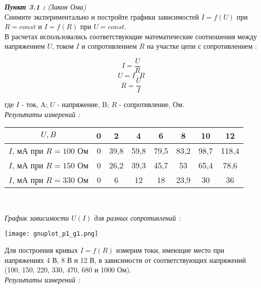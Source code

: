\documentclass[a4paper,11pt]{article}
\begin{document}
	\begin{flushleft}
		\textit{\textbf{Пункт 3.1 :} (Закон Ома)}
		\\
		\medskip
		\hangindent=1.5cm  \noindent
		Снимите экспериментально и постройте графики зависимостей ${I=f(U)}$ при  ${R=const}$ и ${I=f(R)}$ при ${U=const}$.\\
		В расчетах использовались соответствующие математические соотношения между напряжением ${U}$, током ${I}$ и сопротивлением ${R}$ на участке цепи с сопротивлением :
		\begin{center}
			\begin{equation}
				I = \frac{U}{R}
			\end{equation}
			\begin{equation}
				U = I\cdot R
			\end{equation}
			\begin{equation}	
				R = \frac{U}{I}
			\end{equation}
		\end{center}
		где ${I}$ - ток, A; ${U}$ - напряжение, B; ${R}$ -  сопротивление, Ом.
		\\
		\medskip
		\textit{Результаты измерений : }
		\\
		\medskip
		\begin{center}
			\begin{tabular}{|c|c|c|c|c|c|c|c|}
\hline ${U, B}$ & 0 & 2 & 4 & 6 & 8 & 10 & 12 \\ 
\hline ${I}$, мА при ${R=100}$ Ом & 0 & 39,8 & 59,8 & 79,5 & 83,2 & 98,7 & 118,4 \\ 
\hline ${I}$, мА при ${R=150}$ Ом & 0 & 26,2 & 39,3 & 45,7 & 53 & 65,4 & 78,6 \\ 
\hline ${I}$, мА при ${R=330}$ Ом & 0 & 6 & 12 & 18 & 23,9 & 30 & 36 \\ 
\hline 
\end{tabular}
\\
\medskip
\end{center}
		\textit{График зависимости ${U(I)}$ для разных сопротивлений :}
		\\
		\medskip
		\begin{center}
			\texttt{[image: gnuplot\_p1\_g1.png]} 
		\end{center}
		\newpage
		Для построения кривых ${I=f(R)}$ измерим токи, имеющие место при напряжениях 4 В, 8 В и 12 В, в зависимости от соответствующих напряжений (100, 150, 220, 330, 470, 680 и 1000 Ом).\\
		\textit{Результаты измерений :}
		\begin{center}

\end{center}
\end{flushleft}
\end{document}
